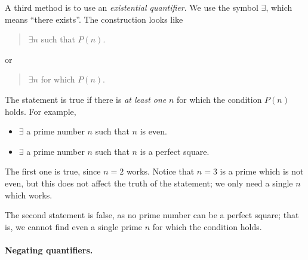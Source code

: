 \documentclass{tufte-book}
\begin{document}
A third method is to use an \emph{existential quantifier}. We use the symbol $\exists$, which means ``there exists''. The construction looks like
\begin{quote}
  $\exists n$ such that $P(n)$. 
\end{quote}
or
\begin{quote}
  $\exists n$ for which $P(n)$.
\end{quote}
The statement is true if there is \emph{at least one} $n$ for which the condition $P(n)$ holds. For example,
\begin{itemize}
    \item $\exists$ a prime number $n$ such that $n$ is even. 
    \item $\exists$ a prime number $n$ such that $n$ is a perfect square.
\end{itemize}
The first one is true, since $n = 2$ works. Notice that $n = 3$ is a prime which is not even, but this does not affect the truth of the statement; we only need a single $n$ which works.

The second statement is false, as no prime number can be a perfect square; that is, we cannot find even a single prime $n$ for which the condition holds.


\paragraph{Negating quantifiers.}
\label{sec:negat-quant}
\end{document}
